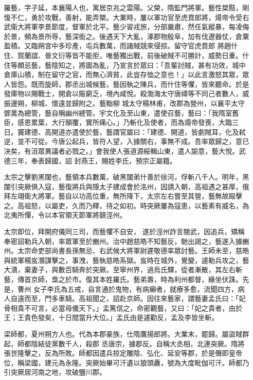 \begin{pinyinscope}
 羅藝，字子延，本襄陽人也，寓居京兆之雲陽。父榮，隋監門將軍。藝性桀黠，剛愎不仁，勇於攻戰，善射，能弄槊。大業時，屢以軍功官至虎賁郎將，煬帝令受右武衛大將軍李景節度，督軍於北平。藝少習戎旅，分部嚴肅，然任氣縱暴，每凌侮於景，頻為景所辱，藝深銜之。後遇天下大亂，涿郡物殷阜，加有伐遼器仗，倉粟盈積。又臨朔宮中多珍產，屯兵數萬，而諸賊競來侵掠。留守官虎賁郎
 將趙什住、賀蘭誼、晉文衍等皆不能拒，唯藝獨出戰，前後破賊不可勝計，威勢日重。什住等頗忌藝，藝陰知之，將圖為亂，乃宣言於眾曰：「吾輩討賊，甚有功效，城中倉庫山積，制在留守之官，而無心濟貧，此豈存恤之意也！」以此言激怒其眾，眾人皆怨。既而旋師，郡丞出城候藝，藝因執之陳兵，而什住等懼，皆來聽命。於是發庫物以賜戰士，開倉以賑窮乏，境內咸悅。殺渤海太守唐禕等不同己者數人，威振邊朔，柳城、懷遠並歸附之。藝黜柳
 城太守楊林甫，改郡為營州，以襄平太守鄧暠為總管，藝自稱幽州總管。宇文化及至山東，遣使召藝，藝曰：「我隋室舊臣，感恩累葉，大行顛覆，實所痛心。」乃斬化及使者，而為煬帝發喪，大臨三日。竇建德、高開道亦遣使於藝，藝謂官屬曰：「建德、開道，皆劇賊耳，化及弒逆，並不可從。今唐公起兵，皆符人望，入據關右，事無不成。吾率眾歸之，意已決矣，有沮眾異議者必戮之。」會我使人張道源綏輯山東，遣人諭意，藝大悅。武德三年，奉表歸國，詔
 封燕王，賜姓李氏，預宗正屬籍。



 太宗之擊劉黑闥也，藝領本兵數萬，破黑闥弟什善於徐河，俘斬八千人。明年，黑闥引突厥俱入寇，藝復將兵與隱太子建成會於洺州，因請入朝，高祖遇之甚厚，俄拜左翊衛大將軍。藝自以功高位重，無所降下，太宗左右嘗至其營，藝無故毆擊之。高祖怒，以屬吏，久而乃釋，待之如初。時突厥屢為寇患，以藝素有威名，為北夷所憚，令以本官領天節軍將鎮涇州。



 太宗即位，拜開府儀同三司，而藝懼不自安，
 遂於涇州詐言閱武，因追兵，矯稱奉密詔勒兵入朝，率眾軍至於豳州。治中趙慈皓不知藝反，馳出謁之，藝遂入據豳州。太宗命吏部尚書長孫無忌、右武候大將軍尉遲敬德率眾討藝。王師未至，慈皓與統軍楊岌潛謀擊之，事洩，藝執慈皓系獄。岌時在城外，覺變，遽勒兵攻之，藝大潰，棄妻子，與數百騎奔於突厥。至寧州界，過烏氏驛，從者漸散，其左右斬藝，傳首京師，梟之於市。復其本姓羅氏。藝弟壽，時為利州都督，緣坐伏誅。先是，曹州
 女子李氏為五戒，自言通於鬼物，有病癩者，就療多愈，流聞四方，病人自遠而至，門多車騎。高祖聞之，詔赴京師。因往來藝家，謂藝妻孟氏曰：「妃骨相貴不可言，必當母儀天下。」孟篤信之，命密觀藝，又曰：「妃之貴者，由於王；王貴色發矣，十日間當升大位。」孟氏由是遽勸反，孟及李皆坐斬。



 梁師都，夏州朔方人也。代為本郡豪族，仕隋鷹揚郎將。大業末，罷歸。屬盜賊群起，師都陰結徒黨數千人，殺郡
 丞唐宗，據郡反。自稱大丞相，北連突厥。隋將張世隆擊之，反為所敗。師都因遣兵掠定雕陰、弘化、延安等郡，於是僭即皇帝位，稱梁國，建元為永隆。突厥始畢可汗遺以狼頭纛，號為大度毗伽可汗。師都乃引突厥居河南之地，攻破鹽川郡。




\end{pinyinscope}
